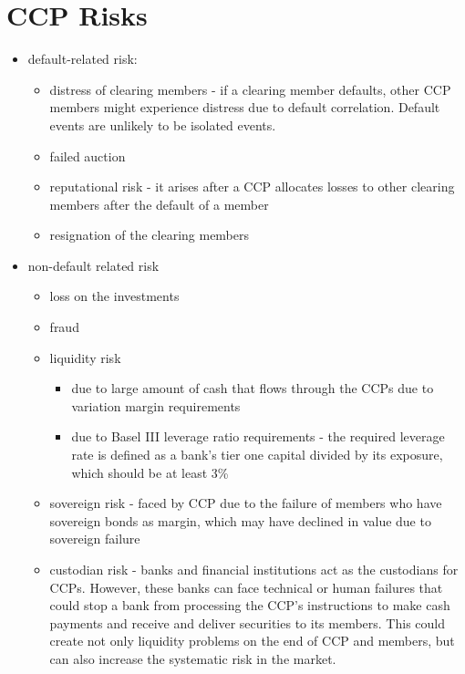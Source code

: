 \section{CCP Risks}
\begin{itemize}
	\item default-related risk:
	\begin{itemize}
		\item distress of clearing members - if a clearing member defaults, other CCP members might experience distress due to default correlation. Default events are unlikely to be isolated events.
		\item failed auction
		\item reputational risk - it arises after a CCP allocates losses to other clearing members after the default of a member
		\item resignation of the clearing members
	\end{itemize}
	\item non-default related risk
	\begin{itemize}
		\item loss on the investments
		\item fraud
		\item liquidity risk
		\begin{itemize}
			\item due to large amount of cash that flows through the CCPs due to variation margin requirements
			\item due to Basel III leverage ratio requirements - the required leverage rate is defined as a bank's tier one capital divided by its exposure, which should be at least 3\%
		\end{itemize}
		\item sovereign risk - faced by CCP due to the failure of members who have sovereign bonds as margin, which may have declined in value due to sovereign failure
		\item custodian risk - banks and financial institutions act as the custodians for CCPs. However, these banks can face technical or human failures that could stop a bank from processing the CCP's instructions to make cash payments and receive and deliver securities to its members. This could create not only liquidity problems on the end of CCP and members, but can also increase the systematic risk in the market.	
	\end{itemize}
\end{itemize}

